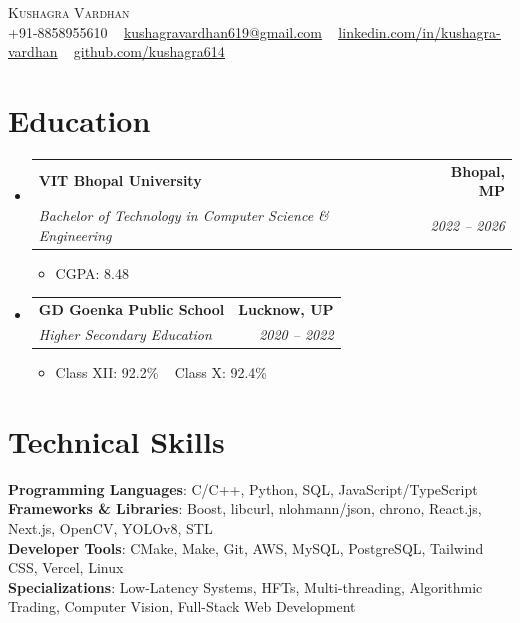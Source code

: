 \documentclass[a4paper,12pt]{article}
\makeatletter
\newcommand{\resumeItem}[1]{
  \item\small{
    {#1 \vspace{-2pt}}
  }
}
\newcommand{\resumeSubheading}[4]{
  \vspace{-2pt}\item
    \begin{tabular*}{1.0\textwidth}[t]{l@{\extracolsep{\fill}}r}
      \textbf{#1} & \textbf{\small #2} \\
      \textit{\small#3} & \textit{\small #4} \\
    \end{tabular*}\vspace{-7pt}
}
\newcommand{\resumeSubHeadingListStart}{\begin{itemize}[leftmargin=0.0in, label={}]}
\newcommand{\resumeSubHeadingListEnd}{\end{itemize}}
\newcommand{\resumeItemListStart}{\begin{itemize}}
\newcommand{\resumeItemListEnd}{\end{itemize}\vspace{-5pt}}
\makeatother
\begin{document}
\begin{center}
    {\Huge \scshape Kushagra Vardhan} \\ \vspace{1pt}
    \small +91-8858955610 ~ \href{mailto:kushagravardhan619@gmail.com}{\underline{kushagravardhan619@gmail.com}} ~ 
    \href{https://linkedin.com/in/kushagra-vardhan/}{\underline{linkedin.com/in/kushagra-vardhan}} ~
    \href{https://github.com/Kushagra614}{\underline{github.com/kushagra614}}
    \vspace{-8pt}
\end{center}

\section{Education}
  \resumeSubHeadingListStart
    \resumeSubheading
      {VIT Bhopal University}{Bhopal, MP}
      {Bachelor of Technology in Computer Science \& Engineering}{2022 -- 2026}
      \resumeItemListStart
        \resumeItem{CGPA: 8.48}
      \resumeItemListEnd
      
    \resumeSubheading
      {GD Goenka Public School}{Lucknow, UP}
      {Higher Secondary Education}{2020 -- 2022}
      \resumeItemListStart
        \resumeItem{Class XII: 92.2\% ~ Class X: 92.4\%}
      \resumeItemListEnd
  \resumeSubHeadingListEnd
   \vspace{-15pt}

\section{Technical Skills}
 \begin{itemize}[leftmargin=0.15in, label={}]
    \small{\item{
     \textbf{Programming Languages}{: C/C++, Python, SQL, JavaScript/TypeScript} \\
     \vspace{3pt}
     \textbf{Frameworks \& Libraries}{: Boost, libcurl, nlohmann/json, chrono, React.js, Next.js, OpenCV, YOLOv8, STL} \\
     \vspace{3pt}
     \textbf{Developer Tools}{: CMake, Make, Git, AWS, MySQL, PostgreSQL, Tailwind CSS, Vercel, Linux} \\
     \vspace{3pt}
     \textbf{Specializations}{: Low-Latency Systems, HFTs, Multi-threading, Algorithmic Trading, Computer Vision, Full-Stack Web Development}
    }}
 \end{itemize}
 \vspace{-16pt}
\end{document}
